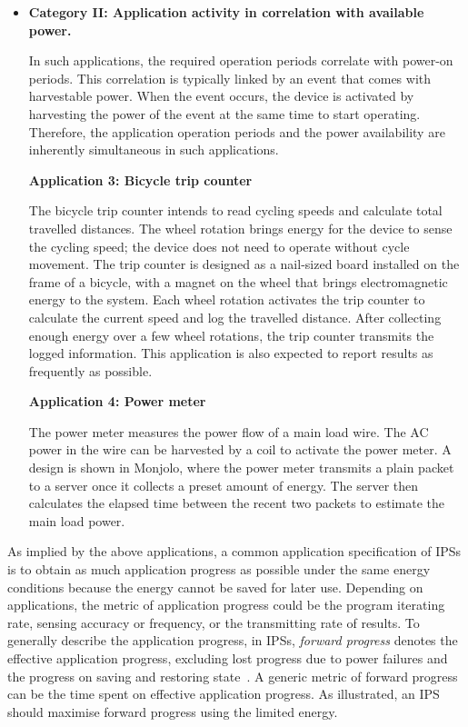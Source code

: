 \begin{itemize}
\item \textbf{Category II: Application activity in correlation with available power.}

In such applications, the required operation periods correlate with power-on periods. 
This correlation is typically linked by an event that comes with harvestable power. 
When the event occurs, the device is activated by harvesting the power of the event at the same time to start operating. 
Therefore, the application operation periods and the power availability are inherently simultaneous in such applications. 

\textbf{Application 3: Bicycle trip counter~\cite{bing2018energy}}

The bicycle trip counter intends to read cycling speeds and calculate total travelled distances. 
The wheel rotation brings energy for the device to sense the cycling speed; the device does not need to operate without cycle movement. 
The trip counter is designed as a nail-sized board installed on the frame of a bicycle, with a magnet on the wheel that brings electromagnetic energy to the system. 
Each wheel rotation activates the trip counter to calculate the current speed and log the travelled distance. 
After collecting enough energy over a few wheel rotations, the trip counter transmits the logged information. 
This application is also expected to report results as frequently as possible. 

\textbf{Application 4: Power meter~\cite{debruin2013monjolo}}

The power meter measures the power flow of a main load wire. 
The AC power in the wire can be harvested by a coil to activate the power meter. 
A design is shown in Monjolo, where the power meter transmits a plain packet to a server once it collects a preset amount of energy. 
The server then calculates the elapsed time between the recent two packets to estimate the main load power. 

\end{itemize}

As implied by the above applications, a common application specification of IPSs is to obtain as much application progress as possible under the same energy conditions because the energy cannot be saved for later use. 
Depending on applications, the metric of application progress could be the program iterating rate, sensing accuracy or frequency, or the transmitting rate of results. 
To generally describe the application progress, in IPSs, \textit{forward progress} denotes the effective application progress, excluding lost progress due to power failures and the progress on saving and restoring state~\cite{7478428}.
A generic metric of forward progress can be the time spent on effective application progress. 
As illustrated, an IPS should maximise forward progress using the limited energy. 

